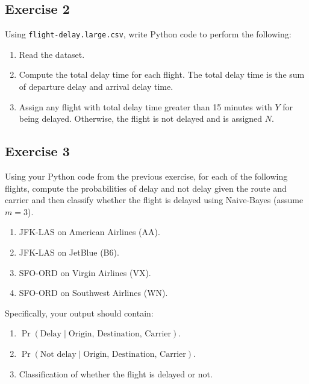 \documentclass[11pt]{article}
\begin{document}
\subsection{Exercise 2}

Using \texttt{flight-delay.large.csv}, write Python code to perform the following:

\begin{enumerate}[label=(\alph*)]
\item Read the dataset.
\item Compute the total delay time for each flight.
    The total delay time is the sum of departure delay and arrival delay time.
\item Assign any flight with total delay time greater than 15 minutes with $Y$ for being delayed.
    Otherwise, the flight is not delayed and is assigned $N$.
\end{enumerate}

\subsection{Exercise 3}

Using your Python code from the previous exercise, for each of the following flights,
compute the probabilities of delay and not delay given the route and carrier
and then classify whether the flight is delayed using Naive-Bayes (assume $m = 3$).

\begin{enumerate}[noitemsep,label=(\alph*)]
\item JFK-LAS on American Airlines (AA).
\item JFK-LAS on JetBlue (B6).
\item SFO-ORD on Virgin Airlines (VX).
\item SFO-ORD on Southwest Airlines (WN).
\end{enumerate}

Specifically, your output should contain:
\begin{enumerate}[noitemsep]
\item $\Pr(\text{Delay} \mid \text{Origin, Destination, Carrier})$.
\item $\Pr(\text{Not delay} \mid \text{Origin, Destination, Carrier})$.
\item Classification of whether the flight is delayed or not.
\end{enumerate}

\bibPrep{}  %

\end{document}
